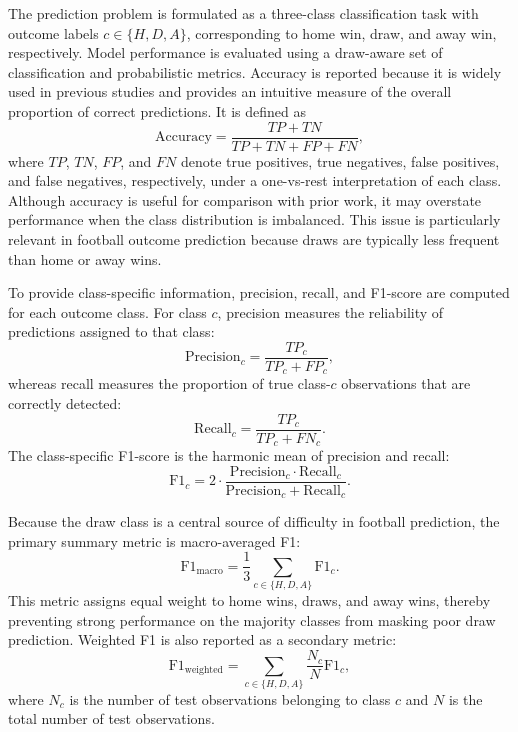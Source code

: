 \documentclass[pdflatex,sn-mathphys-num]{sn-jnl}
\theoremstyle{thmstyleone}
\theoremstyle{thmstyletwo}
\theoremstyle{thmstylethree}
\begin{document}
The prediction problem is formulated as a three-class classification
task with outcome labels
$c\in\{H,D,A\}$, corresponding to home win, draw, and away win,
respectively. Model performance is evaluated using a draw-aware set of
classification and probabilistic metrics. Accuracy is reported because
it is widely used in previous studies and provides an intuitive
measure of the overall proportion of correct predictions. It is defined
as
\begin{equation}
\mathrm{Accuracy}
=
\frac{TP+TN}{TP+TN+FP+FN},
\label{eq:accuracy}
\end{equation}
where $TP$, $TN$, $FP$, and $FN$ denote true positives, true negatives,
false positives, and false negatives, respectively, under a one-vs-rest
interpretation of each class. Although accuracy is useful for
comparison with prior work, it may overstate performance when the
class distribution is imbalanced. This issue is particularly relevant
in football outcome prediction because draws are typically less
frequent than home or away wins.

To provide class-specific information, precision, recall, and F1-score
are computed for each outcome class. For class $c$, precision measures
the reliability of predictions assigned to that class:
\begin{equation}
\mathrm{Precision}_{c}
=
\frac{TP_{c}}{TP_{c}+FP_{c}},
\label{eq:precision}
\end{equation}
whereas recall measures the proportion of true class-$c$ observations
that are correctly detected:
\begin{equation}
\mathrm{Recall}_{c}
=
\frac{TP_{c}}{TP_{c}+FN_{c}}.
\label{eq:recall}
\end{equation}
The class-specific F1-score is the harmonic mean of precision and
recall:
\begin{equation}
\mathrm{F1}_{c}
=
2\cdot
\frac{\mathrm{Precision}_{c}\cdot \mathrm{Recall}_{c}}
{\mathrm{Precision}_{c}+\mathrm{Recall}_{c}}.
\label{eq:f1}
\end{equation}

Because the draw class is a central source of difficulty in football
prediction, the primary summary metric is macro-averaged F1:
\begin{equation}
\mathrm{F1}_{\mathrm{macro}}
=
\frac{1}{3}\sum_{c\in\{H,D,A\}}\mathrm{F1}_{c}.
\label{eq:f1_macro}
\end{equation}
This metric assigns equal weight to home wins, draws, and away wins,
thereby preventing strong performance on the majority classes from
masking poor draw prediction. Weighted F1 is also reported as a
secondary metric:
\begin{equation}
\mathrm{F1}_{\mathrm{weighted}}
=
\sum_{c\in\{H,D,A\}}
\frac{N_c}{N}\mathrm{F1}_{c},
\label{eq:f1_weighted}
\end{equation}
where $N_c$ is the number of test observations belonging to class $c$
and $N$ is the total number of test observations.
\end{document}
